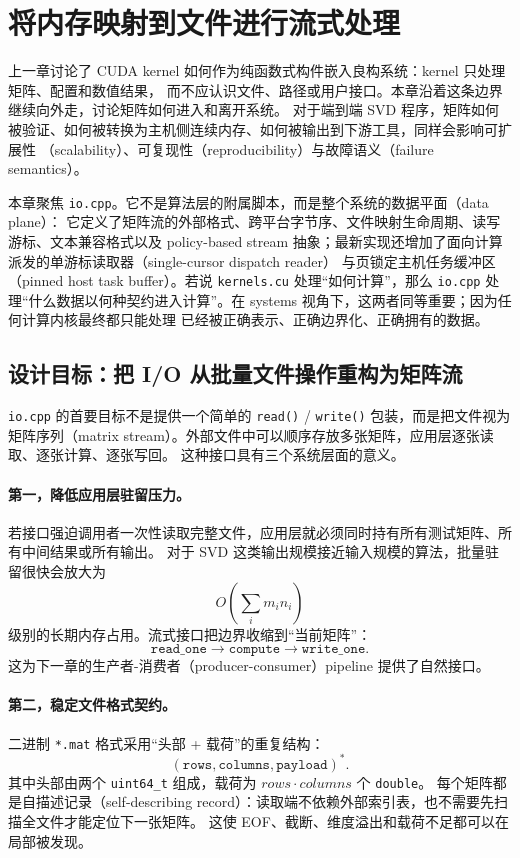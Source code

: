 \section{将内存映射到文件进行流式处理}

上一章讨论了 CUDA kernel 如何作为纯函数式构件嵌入良构系统：kernel 只处理矩阵、配置和数值结果，
而不应认识文件、路径或用户接口。本章沿着这条边界继续向外走，讨论矩阵如何进入和离开系统。
对于端到端 SVD 程序，矩阵如何被验证、如何被转换为主机侧连续内存、如何被输出到下游工具，同样会影响可扩展性
（scalability）、可复现性（reproducibility）与故障语义（failure semantics）。

本章聚焦 \texttt{io.cpp}。它不是算法层的附属脚本，而是整个系统的数据平面（data plane）：
它定义了矩阵流的外部格式、跨平台字节序、文件映射生命周期、读写游标、文本兼容格式以及
policy-based stream 抽象；最新实现还增加了面向计算派发的单游标读取器（single-cursor dispatch reader）
与页锁定主机任务缓冲区（pinned host task buffer）。若说 \texttt{kernels.cu} 处理“如何计算”，那么 \texttt{io.cpp}
处理“什么数据以何种契约进入计算”。在 systems 视角下，这两者同等重要；因为任何计算内核最终都只能处理
已经被正确表示、正确边界化、正确拥有的数据。

\subsection{设计目标：把 I/O 从批量文件操作重构为矩阵流}

\texttt{io.cpp} 的首要目标不是提供一个简单的 \texttt{read()} / \texttt{write()} 包装，而是把文件视为
矩阵序列（matrix stream）。外部文件中可以顺序存放多张矩阵，应用层逐张读取、逐张计算、逐张写回。
这种接口具有三个系统层面的意义。

\paragraph{第一，降低应用层驻留压力。}
若接口强迫调用者一次性读取完整文件，应用层就必须同时持有所有测试矩阵、所有中间结果或所有输出。
对于 SVD 这类输出规模接近输入规模的算法，批量驻留很快会放大为
\[
    O\left(\sum_i m_i n_i\right)
\]
级别的长期内存占用。流式接口把边界收缩到“当前矩阵”：
\[
    \texttt{read\_one} \rightarrow \texttt{compute} \rightarrow \texttt{write\_one}.
\]
这为下一章的生产者-消费者（producer-consumer）pipeline 提供了自然接口。

\paragraph{第二，稳定文件格式契约。}
二进制 \texttt{*.mat} 格式采用“头部 + 载荷”的重复结构：
\[
    (\texttt{rows},\texttt{columns},\texttt{payload})^*.
\]
其中头部由两个 \texttt{uint64\_t} 组成，载荷为 $rows\cdot columns$ 个 \texttt{double}。
每个矩阵都是自描述记录（self-describing record）：读取端不依赖外部索引表，也不需要先扫描全文件才能定位下一张矩阵。
这使 EOF、截断、维度溢出和载荷不足都可以在局部被发现。

